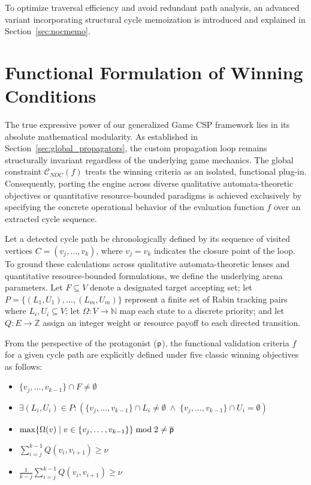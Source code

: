 \documentclass[a4paper,fleqn]{cas-sc}
\begin{document}
To optimize traversal efficiency and avoid redundant path analysis, an advanced variant incorporating structural cycle memoization is introduced and explained in Section~\ref{sec:nocmemo}.


\section{Functional Formulation of Winning Conditions}\label{sec:function_conditions}

The true expressive power of our generalized Game CSP framework lies in its absolute mathematical modularity. As established in Section~\ref{sec:global_propagators}, the custom propagation loop remains structurally invariant regardless of the underlying game mechanics. The global constraint $\mathcal{C}_{\!N\!O\!C}(f)$ treats the winning criteria as an isolated, functional plug-in. Consequently, porting the engine across diverse qualitative automata-theoretic objectives or quantitative resource-bounded paradigms is achieved exclusively by specifying the concrete operational behavior of the evaluation function $f$ over an extracted cycle sequence.

Let a detected cycle path be chronologically defined by its sequence of visited vertices $C = (v_j, \dots, v_k)$, where $v_j = v_k$ indicates the closure point of the loop. To ground these calculations across qualitative automata-theoretic lenses and quantitative resource-bounded formulations, we define the underlying arena parameters. Let $F \subseteq V$ denote a designated target accepting set; let $P = \{ (L_1, U_1), \dots, (L_m, U_m) \}$ represent a finite set of Rabin tracking pairs where $L_i, U_i \subseteq V$; let $\Omega: V \rightarrow \mathbb{N}$ map each state to a discrete priority; and let $Q: E \rightarrow \mathbb{Z}$ assign an integer weight or resource payoff to each directed transition. 

From the perspective of the protagonist ($\mathsf{p}$), the functional validation criteria $f$ for a given cycle path are explicitly defined under five classic winning objectives as follows:

\begin{itemize}[leftmargin=3.1cm, labelwidth=2.8cm, align=right, itemsep=0.8ex, parsep=0pt, topsep=4pt]
    \item [$f^{\mathcal{B}}(v_j, \dots, v_k) =$] $\{v_j, \dots, v_{k-1}\} \cap F \neq \emptyset$
    \item [$f^{\mathcal{R}}(v_j, \dots, v_k) =$] $\exists (L_i, U_i) \in P : \left( \{v_j, \dots, v_{k-1}\} \cap L_i \neq \emptyset \;\land\; \{v_j, \dots, v_{k-1}\} \cap U_i = \emptyset \right)$
    \item [$f^{\omega}(v_j, \dots, v_k) =$] $\max\{\Omega(v) \mid v \in \{v_j, \dots, v_{k-1}\}\} \bmod 2 \neq \overline{\mathsf{p}}$
    \item [$f^{\eta}(v_j, \dots, v_k) =$] $\sum_{i=j}^{k-1} Q(v_i, v_{i+1}) \geq \nu$
    \item [$f^{\mu}(v_j, \dots, v_k) =$] $\frac{1}{k-j} \sum_{i=j}^{k-1} Q(v_i, v_{i+1}) \geq \nu$
\end{itemize}
\end{document}
